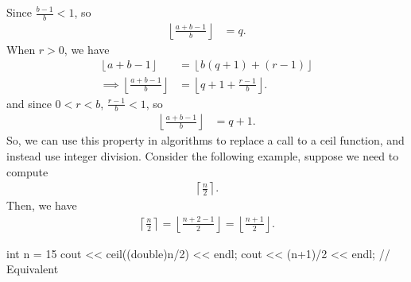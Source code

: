 \documentclass{report}
\begin{document}
    Since $\frac{b-1}{b} < 1$, so
    \begin{align*}
        \left\lfloor \frac{a+b-1}{b} \right\rfloor &= q
    .\end{align*}
    \bigbreak \noindent 
    When $r > 0$, we have
    \begin{align*}
        \left\lfloor a+b-1 \right\rfloor &= \left\lfloor  b(q+1) + (r-1) \right\rfloor \\
        \implies \left\lfloor \frac{a+b-1}{b} \right\rfloor &= \left\lfloor q+1 + \frac{r-1}{b}  \right\rfloor
    .\end{align*}
    and since $0 < r < b$, $ \frac{r-1}{b} < 1 $, so
    \begin{align*}
        \left\lfloor \frac{a+b-1}{b} \right\rfloor &= q + 1
    .\end{align*}
    \bigbreak \noindent 
    So, we can use this property in algorithms to replace a call to a ceil function, and instead use integer division. Consider the following example, suppose we need to compute
    \begin{align*}
       \left\lceil \frac{n}{2} \right\rceil
    .\end{align*}
    Then, we have
    \begin{align*}
       \left\lceil \frac{n}{2} \right\rceil  = \left\lfloor \frac{n+2-1}{2} \right\rfloor = \left\lfloor \frac{n+1}{2} \right\rfloor
    .\end{align*}
    \bigbreak \noindent 
    \begin{cppcode}
    int n = 15 
    cout << ceil((double)n/2) << endl;
    cout << (n+1)/2 << endl; // Equivalent
    \end{cppcode}

    \bigbreak \noindent 
\end{document}
